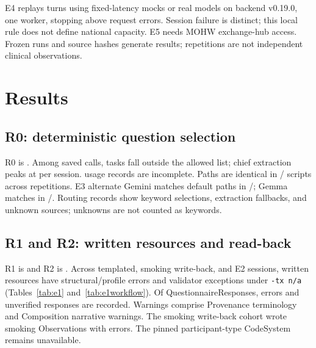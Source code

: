 E4 replays turns using fixed-latency mocks or real models on backend v0.19.0,
one worker, stopping above \ELoadStopThreshold{} request errors. Session failure
is distinct; this local rule does not define national capacity. E5 needs MOHW
exchange-hub access. Frozen runs and source hashes generate results; repetitions
are not independent clinical observations.

\section{Results}\label{sec:results}

\subsection{R0: deterministic question selection}
R0 is \textbf{\RZeroVerdict{}}. Among \ETwoDetCalls{} saved calls,
\ETwoDetUnexpectedTasks{} tasks fall outside the allowed list; chief extraction
peaks at \ETwoDetChiefMax{} per session. \ETwoDetUsageIncomplete{} usage records
are incomplete. Paths are identical in \RZeroStableScripts{}/\RZeroScripts{}
scripts across \RZeroRepeats{} repetitions. E3 alternate Gemini matches default
paths in \EThreeAlternateDetSamePaths{}/\EThreeAlternateDetComparedScripts{};
Gemma matches in \EThreeLocalDetSamePaths{}/\EThreeLocalDetComparedScripts{}.
Routing records show \ETwoDetKeywordSources{} keyword selections,
\ETwoDetExtractorSources{} extraction fallbacks, and \ETwoDetUnknownSources{}
unknown sources; unknowns are not counted as keywords.

\subsection{R1 and R2: written resources and read-back}
R1 is \textbf{\ROneVerdict{}} and R2 is \textbf{\RTwoVerdict{}}.
Across \EOneTemplatedSessions{} templated, \EOneObservationSessions{} smoking write-back,
and \EOneScenarioSessions{} E2 sessions, \EOneResources{} written resources have
\EOneErrors{} structural/profile errors
and \EOneValidatorCrashes{} validator exceptions under \texttt{-tx n/a}
(Tables~\ref{tab:e1} and~\ref{tab:e1workflow}). Of
\EOneQuestionnaireResponses{} QuestionnaireResponses, \EOneQRErrors{} errors and
\EOneQRUnverified{} unverified responses are recorded. Warnings comprise
\EOneProvenanceWarnings{} Provenance terminology and \EOneCompositionWarnings{}
Composition narrative warnings. The smoking write-back cohort wrote
\EOneObservationResources{} smoking Observations with \EOneObservationErrors{} errors.
The pinned participant-type CodeSystem remains unavailable.

